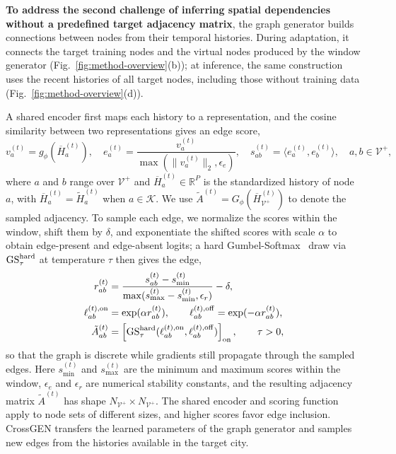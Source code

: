 \documentclass[runningheads,a4paper]{llncs}
\begin{document}
\textbf{To address the second challenge of inferring spatial dependencies without a predefined target adjacency matrix}, the graph generator builds connections between nodes from their temporal histories. During adaptation, it connects the target training nodes and the virtual nodes produced by the window generator (Fig.~\ref{fig:method-overview}(b)); at inference, the same construction uses the recent histories of all target nodes, including those without training data (Fig.~\ref{fig:method-overview}(d)).

A shared encoder first maps each history to a representation, and the cosine similarity between two representations gives an edge score,
\begin{equation}
  v_a^{(t)}=g_\phi(\overline H_a^{(t)}),\quad e_a^{(t)}=\frac{v_a^{(t)}}{\max(\|v_a^{(t)}\|_2,\epsilon_e)},\quad
  s_{ab}^{(t)}=\langle e_a^{(t)},e_b^{(t)}\rangle,\quad a,b\in\mathcal V^{+} ,
  \label{eq:graph-history-scores}
\end{equation}
where $a$ and $b$ range over $\mathcal V^{+}$ and $\overline H_a^{(t)}\in\mathbb R^{P}$ is the standardized history of node $a$, with $\overline H_a^{(t)}=\widetilde H_a^{(t)}$ when $a\in\mathcal K$. We use $\tilde A^{(t)}=G_\phi(\overline H_{\mathcal V^{+}}^{(t)})$ to denote the sampled adjacency. To sample each edge, we normalize the scores within the window, shift them by $\delta$, and exponentiate the shifted scores with scale $\alpha$ to obtain edge-present and edge-absent logits; a hard Gumbel-Softmax~\cite{gumbel} draw via $\operatorname{GS}^{\rm hard}_{\tau}$ at temperature $\tau$ then gives the edge,
\begin{equation}
\begin{aligned}
  r_{ab}^{(t)}&=\frac{s_{ab}^{(t)}-s_{\min}^{(t)}}{\max(s_{\max}^{(t)}-s_{\min}^{(t)},\epsilon_r)}-\delta,\\
  \ell_{ab}^{(t),\rm on}&=\exp(\alpha r_{ab}^{(t)}),\qquad
  \ell_{ab}^{(t),\rm off}=\exp(-\alpha r_{ab}^{(t)}),\\
  \tilde A_{ab}^{(t)}&=\left[\operatorname{GS}^{\rm hard}_{\tau}(\ell_{ab}^{(t),\rm on},\ell_{ab}^{(t),\rm off})\right]_{\rm on},
  \qquad \tau>0 ,
\end{aligned}
  \label{eq:sparse-graph}
\end{equation}
so that the graph is discrete while gradients still propagate through the sampled edges. Here $s_{\min}^{(t)}$ and $s_{\max}^{(t)}$ are the minimum and maximum scores within the window, $\epsilon_e$ and $\epsilon_r$ are numerical stability constants, and the resulting adjacency matrix $\tilde A^{(t)}$ has shape $N_{\mathcal V^{+}}\times N_{\mathcal V^{+}}$. The shared encoder and scoring function apply to node sets of different sizes, and higher scores favor edge inclusion. CrossGEN transfers the learned parameters of the graph generator and samples new edges from the histories available in the target city.
\end{document}
